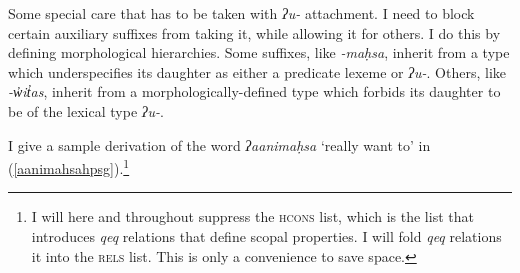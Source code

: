 Some special care that has to be taken with \textit{ʔu-} attachment. I need to block certain auxiliary suffixes from taking it, while allowing it for others. I do this by defining morphological hierarchies. Some suffixes, like \textit{-maḥsa}, inherit from a type which underspecifies its daughter as either a predicate lexeme or \textit{ʔu-}. Others, like \textit{-w̓it̓as}, inherit from a morphologically-defined type which forbids its daughter to be of the lexical type \textit{ʔu-}.

I give a sample derivation of the word \textit{ʔaanimaḥsa} `really want to' in (\ref{aanimahsahpsg}).\footnote{I will here and throughout suppress the \textsc{hcons} list, which is the list that introduces \textit{qeq} relations that define scopal properties. I will fold \textit{qeq} relations it into the \textsc{rels} list. This is only a convenience to save space.}

